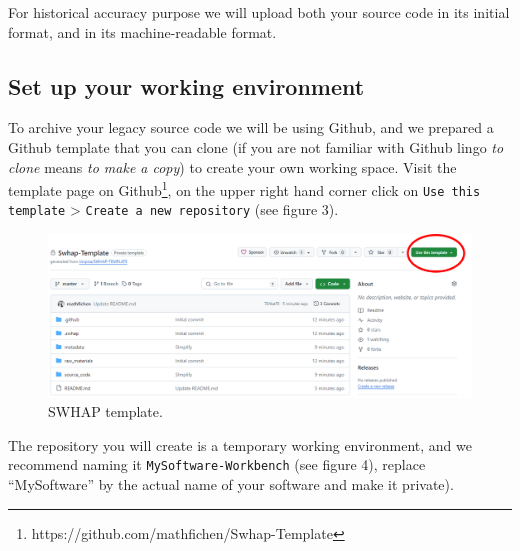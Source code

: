 \documentclass[]{article}
\newcommand{\passthrough}[1]{#1}
\begin{document}
For historical accuracy purpose we will upload both your source code in
its initial format, and in its machine-readable format.

\hypertarget{set-up-your-working-environment}{%
\subsection{Set up your working
environment}\label{set-up-your-working-environment}}

To archive your legacy source code we will be using Github, and we
prepared a Github template that you can clone (if you are not familiar
with Github lingo \emph{to clone} means \emph{to make a copy}) to create
your own working space. Visit the template page on Github\footnote{https://github.com/mathfichen/Swhap-Template},
on the upper right hand corner click on
\passthrough{\lstinline!Use this template!} \textgreater{}
\passthrough{\lstinline!Create a new repository!} (see figure 3).

\begin{figure}
\hypertarget{fig:template}{%
\centering
\includegraphics{./media2/01_template.png}
\caption{SWHAP template.}\label{fig:template}
}
\end{figure}

The repository you will create is a temporary working environment, and
we recommend naming it \passthrough{\lstinline!MySoftware-Workbench!}
(see figure 4), replace ``MySoftware'' by the actual name of your
software and make it private).
\end{document}
